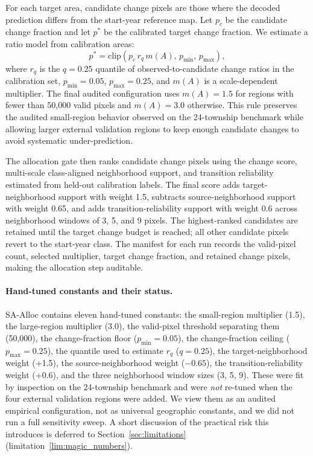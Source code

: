 \documentclass{article}
\begin{document}
For each target area, candidate change pixels are those where the decoded prediction differs from the start-year reference map. Let $p_c$ be the candidate change fraction and let $p^\ast$ be the calibrated target change fraction. We estimate a ratio model from calibration areas:
\begin{equation}
p^\ast = \mathrm{clip}\left(p_c \, r_q \, m(A),\, p_{\min},\, p_{\max}\right),
\end{equation}
where $r_q$ is the $q=0.25$ quantile of observed-to-candidate change ratios in the calibration set, $p_{\min}=0.05$, $p_{\max}=0.25$, and $m(A)$ is a scale-dependent multiplier. The final audited configuration uses $m(A)=1.5$ for regions with fewer than 50{,}000 valid pixels and $m(A)=3.0$ otherwise. This rule preserves the audited small-region behavior observed on the 24-township benchmark while allowing larger external validation regions to keep enough candidate changes to avoid systematic under-prediction.

The allocation gate then ranks candidate change pixels using the change score, multi-scale class-aligned neighborhood support, and transition reliability estimated from held-out calibration labels. The final score adds target-neighborhood support with weight 1.5, subtracts source-neighborhood support with weight 0.65, and adds transition-reliability support with weight 0.6 across neighborhood windows of 3, 5, and 9 pixels. The highest-ranked candidates are retained until the target change budget is reached; all other candidate pixels revert to the start-year class. The manifest for each run records the valid-pixel count, selected multiplier, target change fraction, and retained change pixels, making the allocation step auditable.

\paragraph{Hand-tuned constants and their status.} SA-Alloc contains eleven hand-tuned constants: the small-region multiplier (1.5), the large-region multiplier (3.0), the valid-pixel threshold separating them (50{,}000), the change-fraction floor ($p_{\min}=0.05$), the change-fraction ceiling ($p_{\max}=0.25$), the quantile used to estimate $r_q$ ($q=0.25$), the target-neighborhood weight (+1.5), the source-neighborhood weight ($-0.65$), the transition-reliability weight (+0.6), and the three neighborhood window sizes (3, 5, 9). These were fit by inspection on the 24-township benchmark and were \emph{not} re-tuned when the four external validation regions were added. We view them as an audited empirical configuration, not as universal geographic constants, and we did not run a full sensitivity sweep. A short discussion of the practical risk this introduces is deferred to Section~\ref{sec:limitations} (limitation~\ref{lim:magic_numbers}).
\end{document}
